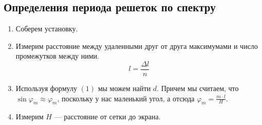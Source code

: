 \documentclass[a4paper, 12pt]{article}%
\begin{document}
\subsection{Определения периода решеток по спектру}
\begin{enumerate}
\item Соберем установку. 
\item Измерим расстояние между удаленными друг от друга максимумами и число промежутков между ними.
\[l = \dfrac{\Delta l}{n}\]
\item Используя формулу $(1)$ мы можем найти $d$. Причем мы считаем, что 
$\sin \varphi_m \approx \varphi_m$, поскольку у нас маленький угол, а отсюда $\varphi_m = \frac{m \cdot l}{H}$. 
\item Измерим $H$ --- расстояние от сетки до экрана. 


\end{enumerate}
\end{document}
